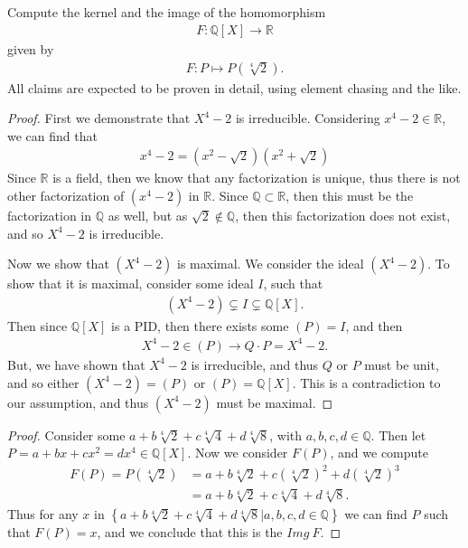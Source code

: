 \documentclass[10pt]{armath}
\newcommand{\R}{\mathbb{R}}
\newcommand{\Q}{\mathbb{Q}}
\newcommand{\ra}{\rightarrow}
\newenvironment{claim}[1]{\par\noindent\textit{Claim:}\space#1}{}
\begin{document}
\subsection{}%
\label{sub:2a}

Compute the kernel and the image of the homomorphism
\begin{align*}
  F:\Q[X]\ra\R
\end{align*}
given by
\begin{align*}
  F:P\mapsto P\left(\sqrt[4]{2}\right).
\end{align*}
All claims are expected to be proven in detail, using element chasing and the
like.

\begin{proof}
  First we demonstrate that $X^4-2$ is irreducible. Considering $x^4-2\in\R$,
  we can find that
  \begin{align*}
    x^4-2=(x^2-\sqrt{2})(x^2+\sqrt{2})
  \end{align*}
  Since $\R$ is a field, then we know that any factorization is unique, thus
  there is not other factorization of $(x^4-2)$ in $\R$. Since $\Q\subset\R$,
  then this must be the factorization in $\Q$ as well, but as
  $\sqrt{2}\notin\Q$, then this factorization does not exist, and so $X^4-2$ is
  irreducible.

  Now we show that $(X^4-2)$ is maximal. We consider the ideal $(X^4-2)$. To
  show that it is maximal, consider some ideal $I$, such that
  \begin{align*}
    (X^4-2)\subsetneq I\subsetneq \Q[X].
  \end{align*}
  Then since $\Q[X]$ is a PID, then there exists some $(P)=I$, and then
  \begin{align*}
    X^4-2\in(P)\ra Q\cdot P=X^4-2.
  \end{align*}
  But, we have shown that $X^4-2$ is irreducible, and thus $Q$ or $P$ must be
  unit, and so either $(X^4-2)=(P)$ or $(P)=\Q[X]$. This is a contradiction to
  our assumption, and thus $(X^4-2)$ must be maximal.
\end{proof}

\begin{proof}
  Consider some $a+b\sqrt[4]{2}+c\sqrt[4]{4}+d\sqrt[4]{8}$, with
  $a,b,c,d\in\Q$. Then let $P=a+bx+cx^2=dx^4\in\Q[X]$. Now we consider $F(P)$,
  and we compute
  \begin{align*}
    F(P)=P(\sqrt[4]{2})&=a+b\sqrt[4]{2}+c\left(\sqrt[4]{2}\right)^2+d\left(\sqrt[4]{2}\right)^3\\
    &=a+b\sqrt[4]{2}+c\sqrt[4]{4}+d\sqrt[4]{8}.
  \end{align*}
  Thus for any $x$ in
  $\left\{a+b\sqrt[4]{2}+c\sqrt[4]{4}+d\sqrt[4]{8}\vert a,b,c,d\in\Q\right\}$
  we can find $P$ such that $F(P)=x$, and we conclude that this is the $Img\
  F$.
\end{proof}
\end{document}
